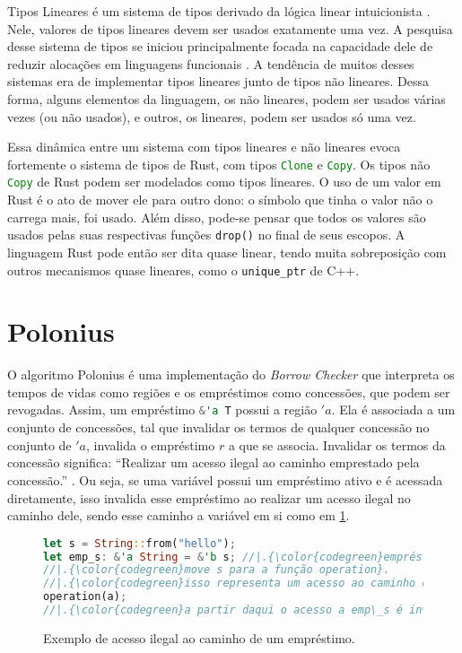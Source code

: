 Tipos Lineares é um sistema de tipos derivado da lógica linear intuicionista \cite{CSLINLOG}. Nele, valores de tipos lineares devem ser usados exatamente uma vez. A pesquisa desse sistema de tipos se iniciou principalmente focada na capacidade dele de reduzir alocações em linguagens funcionais \cite{Wadler1990LinearTC}. A tendência de muitos desses sistemas era de implementar tipos lineares junto de tipos não lineares. Dessa forma, alguns elementos da linguagem, os não lineares, podem ser usados várias vezes (ou não usados), e outros, os lineares, podem ser usados só uma vez. 

Essa dinâmica entre um sistema com tipos lineares e não lineares evoca fortemente o sistema de tipos de Rust, com tipos \lstinline[language=Rust]|Clone| e \lstinline[language=Rust]|Copy|. Os tipos não \lstinline[language=Rust]|Copy| de Rust podem ser modelados como tipos lineares. O uso de um valor em Rust é o ato de mover ele para outro dono: o símbolo que tinha o valor não o carrega mais, foi usado. Além disso, pode-se pensar que todos os valores são usados pelas suas respectivas funções \lstinline[language=Rust]|drop()| no final de seus escopos. A linguagem Rust pode então ser dita quase linear, tendo muita sobreposição com outros mecanismos quase lineares, como o \lstinline[language=C]|unique_ptr| de C++. 

\section{Polonius}


O algoritmo Polonius é uma implementação do \emph{Borrow Checker} que interpreta os tempos de vidas como regiões e os empréstimos como concessões, que podem ser revogadas. Assim, um empréstimo \lstinline[language=Rust]|&'a T| possui a região $'a$. Ela é associada a um conjunto de concessões, tal que invalidar os termos de qualquer concessão no conjunto de $'a$, invalida o empréstimo $r$ a que se associa. Invalidar os termos da concessão significa: ``Realizar um acesso ilegal ao caminho emprestado pela concessão.'' \cite{Matsakis2018}. Ou seja, se uma variável possui um empréstimo ativo e é acessada diretamente, isso invalida esse empréstimo ao realizar um acesso ilegal no caminho dele, sendo esse caminho a variável em si como em \ref{fig:ex:polonius}. 
\begin{figure}[ht]
	\caption{Exemplo de acesso ilegal ao caminho de um empréstimo.}
	\label{fig:ex:polonius}
	\begin{lstlisting}[language=Rust]
let s = String::from("hello");
let emp_s: &'a String = &'b s; //|.{\color{codegreen}empréstimo realizado a s}.
//|.{\color{codegreen}move s para a função operation}.
//|.{\color{codegreen}isso representa um acesso ao caminho de emp\_s, o acesso a s em sí}.
operation(a); 
//|.{\color{codegreen}a partir daqui o acesso a emp\_s é inválido}.
	\end{lstlisting}
\end{figure}

